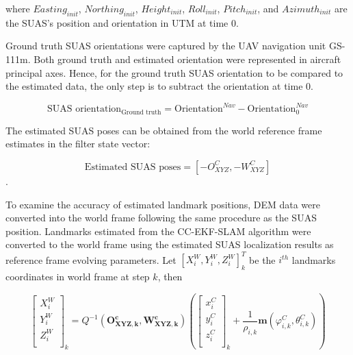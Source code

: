 \noindent where $Easting_{init}$, $Northing_{init}$,
$Height_{init}$, $Roll_{init}$, $Pitch_{init}$, and
$Azimuth_{init}$ are the SUAS's position and orientation in UTM at time 0. 

Ground truth SUAS orientations were captured by the UAV navigation
unit GS-111m. Both ground truth and estimated orientation were
represented in aircraft principal axes. Hence, for the ground truth
SUAS orientation to be compared to the estimated data, the only step
is to subtract the orientation at time 0.

$$\text{SUAS orientation}_{\text{Ground truth}} =
\text{Orientation}^{Nav} - \text{Orientation}^{Nav}_0$$

The estimated SUAS poses can be obtained from the world reference
frame estimates in the filter state vector:

$$ \text{Estimated SUAS poses} = 
[-O_{XYZ}^{C}, -W_{XYZ}^{C}]$$.


To examine the accuracy of estimated landmark positions, DEM data were
converted into the world frame following the same procedure as the SUAS
position. Landmarks estimated from the CC-EKF-SLAM algorithm were
converted to the world frame using the estimated SUAS localization results
as reference frame evolving parameters. Let $[X_i^W,Y_i^W,
Z_i^W]^T_k$ be the $i^{th}$ landmarks coordinates in world frame at
step $k$, then

\begin{equation}
  \left[ \begin{array}{c}
    X_{i}^{W}  \\
    Y_{i}^{W}  \\
    Z_{i}^{W}  \\
  \end{array} \right]_k=Q^{-1}(\boldsymbol{O_{XYZ, k}^{c}}, \boldsymbol{W_{XYZ,k}^{c}})\left(\left[
    \begin{array}{c}
      x_{i}^{C} \\
      y_{i}^{C} \\
      z_{i}^{C} \\
    \end{array}
  \right]_k+\frac{1}{\rho _{i,k}}\boldsymbol{m}(\varphi_{i,k}^{C},\theta_{i,k}^{C})\right)
\end{equation}

